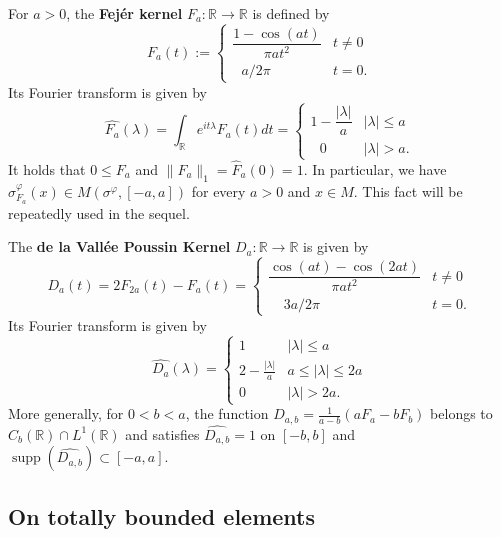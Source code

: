 \documentclass[12pt]{amsart}
\theoremstyle{definition}
\begin{document}
For $a>0$, the {\bf Fej\'er kernel} $F_a:\mathbb{R}\to \mathbb{R}$ is defined by 
\[F_a(t):=\begin{cases}\dfrac{1-\cos (at)}{\pi at^2} & t\neq 0\\
\ \ \ a/2\pi & t=0. \end{cases}\]
Its Fourier transform is given by
\[\widehat{F_a}(\lambda)=\int_{\mathbb{R}}e^{it\lambda}F_a(t)dt=\begin{cases}1-\dfrac{|\lambda|}{a} & |\lambda|\le a\\
 \ \ \ 0 & |\lambda|>a.\end{cases}\]
It holds that $0\le F_a$ and $\|F_a\|_1=\widehat{F}_a(0)=1$.
In particular, we have $\sigma_{F_a}^{\varphi}(x)\in M(\sigma^{\varphi},[-a,a])$ for every $a>0$ and $x\in M$. This fact will be repeatedly used in the sequel. 

The {\bf de la Vall\'ee Poussin Kernel} $D_a:\mathbb{R}\to \mathbb{R}$ is given by
\[
D_a(t)=2F_{2a}(t)-F_a(t)=\begin{cases}
\dfrac{\cos (at)-\cos (2at)}{\pi at^2} & t\neq 0\\
\ \ \ \ \ 3a/2\pi & t=0.
\end{cases}
\]
Its Fourier transform is given by
\[\widehat{D_a}(\lambda)=\begin{cases}
1 & |\lambda|\le a\\
2-\frac{|\lambda|}{a}  & a\le |\lambda|\le 2a\\
0 & |\lambda|>2a.
\end{cases}\]
More generally, for $0<b<a$, the function $D_{a,b}=\frac{1}{a-b}(aF_a-bF_b)$ belongs to $C_b(\mathbb R)\cap L^1(\mathbb R)$ and satisfies $\widehat{D_{a,b}}=1$ on $[-b,b]$ and $\operatorname{supp}(\widehat{D_{a,b}})\subset [-a,a]$.
\subsection{On totally bounded elements}\label{subsec tb elements}
\end{document}
